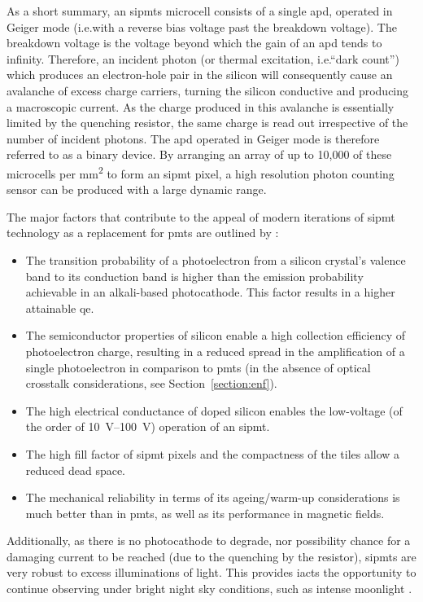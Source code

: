 As a short summary, an \glspl{sipmt} microcell consists of a single \gls{apd}, operated in Geiger mode (i.e.\@ with a reverse bias voltage past the breakdown voltage). The breakdown voltage is the voltage beyond which the gain of an \gls{apd} tends to infinity. Therefore, an incident photon (or thermal excitation, i.e.\@ ``dark count'') which produces an electron-hole pair in the silicon will consequently cause an avalanche of excess charge carriers, turning the silicon conductive and producing a macroscopic current. As the charge produced in this avalanche is essentially limited by the quenching resistor, the same charge is read out irrespective of the number of incident photons. The \gls{apd} operated in Geiger mode is therefore referred to as a binary device. By arranging an array of up to 10,000 of these microcells per \si{mm\squared} to form an \gls{sipmt} pixel, a high resolution photon counting sensor can be produced with a large dynamic range.

The major factors that contribute to the appeal of modern iterations of \gls{sipmt} technology as a replacement for \glspl{pmt} are outlined by \textcite{Ghassemi2017}:
\begin{itemize}
\item The transition probability of a photoelectron from a silicon crystal’s valence band to its conduction band is higher than the emission probability achievable in an alkali-based photocathode. This factor results in a higher attainable \gls{qe}. 
\item The semiconductor properties of silicon enable a high collection efficiency of photoelectron charge, resulting in a reduced spread in the amplification of a single photoelectron in comparison to \glspl{pmt} (in the absence of optical crosstalk considerations, see Section~\ref{section:enf}).
\item The high electrical conductance of doped silicon enables the low-voltage (of the order of \SIrange{10}{100}{V}) operation of an \gls{sipmt}.
\item The high fill factor of \gls{sipmt} pixels and the compactness of the tiles allow a reduced dead space.
\item The mechanical reliability in terms of its ageing/warm-up considerations is much better than in \glspl{pmt}, as well as its performance in magnetic fields.
\end{itemize}

Additionally, as there is no photocathode to degrade, nor possibility chance for a damaging current to be reached (due to the quenching by the resistor), \glspl{sipmt} are very robust to excess illuminations of light. This provides \glspl{iact} the opportunity to continue observing under bright night sky conditions, such as intense moonlight \cite{Knoetig2013,Heller2017}.

